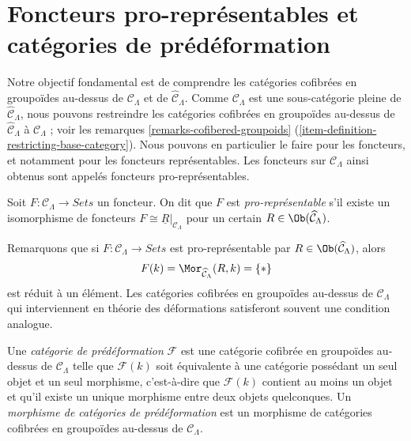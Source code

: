 \section{Foncteurs pro-représentables et catégories de prédéformation}
\label{section-cofibered-groupoids}

\noindent
Notre objectif fondamental est de comprendre les catégories cofibrées en
groupoïdes au-dessus de $\mathcal{C}_\Lambda$ et de
$\widehat{\mathcal{C}}_\Lambda$. Comme $\mathcal{C}_\Lambda$ est une
sous-catégorie pleine de $\widehat{\mathcal{C}}_\Lambda$, nous pouvons
restreindre les catégories cofibrées en groupoïdes au-dessus de
$\widehat{\mathcal{C}}_\Lambda$ à $\mathcal{C}_\Lambda$ ; voir les remarques
\ref{remarks-cofibered-groupoids}
(\ref{item-definition-restricting-base-category}).
Nous pouvons en particulier le faire pour les foncteurs, et notamment pour
les foncteurs représentables. Les foncteurs sur $\mathcal{C}_\Lambda$
ainsi obtenus sont appelés foncteurs pro-représentables.

\begin{definition}
\label{definition-prorepresentable}
Soit $F : \mathcal{C}_\Lambda \to \textit{Sets}$ un foncteur.
On dit que $F$ est {\it pro-représentable} s'il existe un isomorphisme
de foncteurs $F \cong \underline{R}|_{\mathcal{C}_\Lambda}$ pour un certain
$R \in \Ob(\widehat{\mathcal{C}}_\Lambda)$.
\end{definition}

\noindent
Remarquons que si $F : \mathcal{C}_\Lambda \to \textit{Sets}$ est
pro-représentable par $R \in \Ob(\widehat{\mathcal{C}}_\Lambda)$, alors
$$
F(k) = \Mor_{\widehat{\mathcal{C}}_\Lambda}(R, k) = \{*\}
$$
est réduit à un élément. Les catégories cofibrées en groupoïdes au-dessus de
$\mathcal{C}_\Lambda$ qui interviennent en théorie des déformations
satisferont souvent une condition analogue.

\begin{definition}
\label{definition-predeformation-category}
Une {\it catégorie de prédéformation} $\mathcal{F}$ est une catégorie
cofibrée en groupoïdes au-dessus de $\mathcal{C}_\Lambda$ telle que
$\mathcal{F}(k)$ soit équivalente à une catégorie possédant un seul objet et
un seul morphisme, c'est-à-dire que $\mathcal{F}(k)$ contient au moins un
objet et qu'il existe un unique morphisme entre deux objets quelconques. Un
{\it morphisme de catégories de prédéformation} est un morphisme de catégories
cofibrées en groupoïdes au-dessus de
$\mathcal{C}_\Lambda$.
\end{definition}

